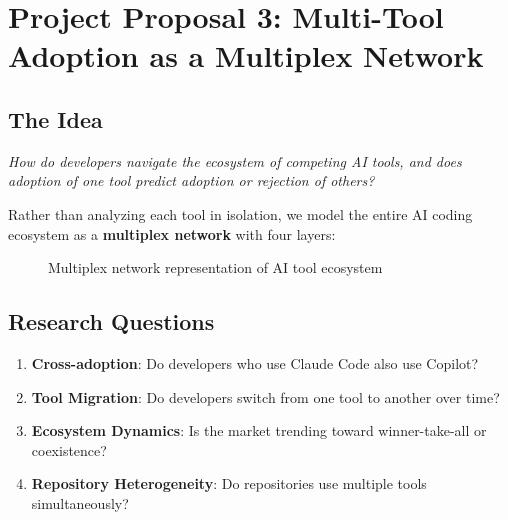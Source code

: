 \documentclass[11pt,letterpaper]{article}
\begin{document}
\section{Project Proposal 3: Multi-Tool Adoption as a Multiplex Network}

\subsection{The Idea}

\begin{tcolorbox}[colback=orange!5,colframe=orange!75!black,title=Core Question]
\textit{How do developers navigate the ecosystem of competing AI tools, and does adoption of one tool predict adoption or rejection of others?}
\end{tcolorbox}

Rather than analyzing each tool in isolation, we model the entire AI coding ecosystem as a \textbf{multiplex network} with four layers:

\begin{figure}[h]
\centering
{}
\caption{Multiplex network representation of AI tool ecosystem}
\end{figure}

\subsection{Research Questions}

\begin{enumerate}
    \item \textbf{Cross-adoption}: Do developers who use Claude Code also use Copilot?
    \item \textbf{Tool Migration}: Do developers switch from one tool to another over time?
    \item \textbf{Ecosystem Dynamics}: Is the market trending toward winner-take-all or coexistence?
    \item \textbf{Repository Heterogeneity}: Do repositories use multiple tools simultaneously?
\end{enumerate}
\end{document}
